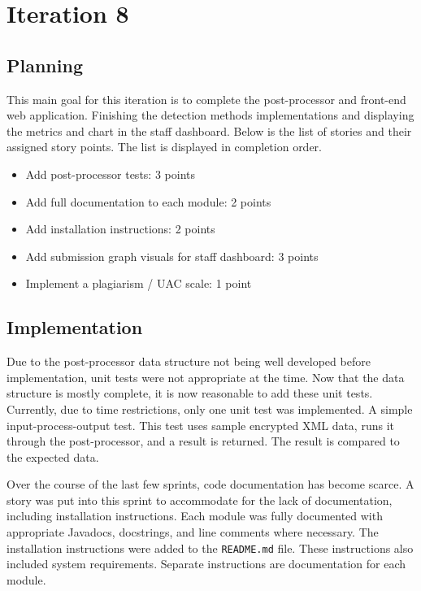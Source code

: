 \chapter{Iteration 8}
\section{Planning}
This main goal for this iteration is to complete the post-processor and front-end web application. Finishing the detection methods implementations and displaying the metrics and chart in the staff dashboard. Below is the list of stories and their assigned story points. The list is displayed in completion order.

\begin{itemize}
\item Add post-processor tests: 3 points
\item Add full documentation to each module: 2 points
\item Add installation instructions: 2 points
\item Add submission graph visuals for staff dashboard: 3 points
\item Implement a plagiarism / UAC scale: 1 point
\end{itemize}

\section{Implementation}
Due to the post-processor data structure not being well developed before implementation, unit tests were not appropriate at the time. Now that the data structure is mostly complete, it is now reasonable to add these unit tests. Currently, due to time restrictions, only one unit test was implemented. A simple input-process-output test. This test uses sample encrypted XML data, runs it through the post-processor, and a result is returned. The result is compared to the expected data.

Over the course of the last few sprints, code documentation has become scarce. A story was put into this sprint to accommodate for the lack of documentation, including installation instructions. Each module was fully documented with appropriate Javadocs, docstrings, and line comments where necessary. The installation instructions were added to the \texttt{README.md} file. These instructions also included system requirements. Separate instructions are documentation for each module.

